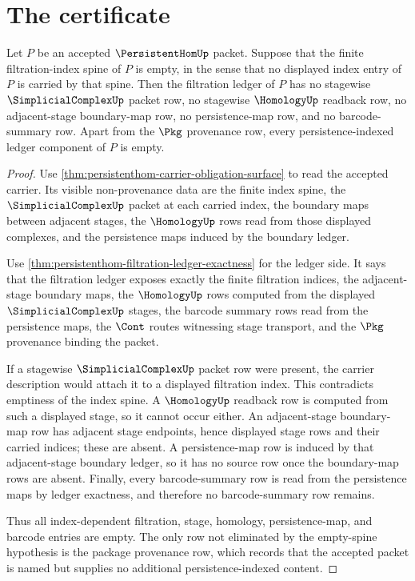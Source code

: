 \section{The certificate}
\label{sec:persistenthom-certificate}

\begin{theorem}
\label{thm:persistenthom-empty-filtration-spine-ledger-collapse}
Let $P$ be an accepted $\PersistentHomUp$ packet. Suppose that the finite filtration-index spine of $P$ is empty, in the sense that no displayed index entry of $P$ is carried by that spine. Then the filtration ledger of $P$ has no stagewise $\SimplicialComplexUp$ packet row, no stagewise $\HomologyUp$ readback row, no adjacent-stage boundary-map row, no persistence-map row, and no barcode-summary row. Apart from the $\Pkg$ provenance row, every persistence-indexed ledger component of $P$ is empty.
\end{theorem}
\begin{proof}
Use \autoref{thm:persistenthom-carrier-obligation-surface} to read the accepted carrier. Its visible non-provenance data are the finite index spine, the $\SimplicialComplexUp$ packet at each carried index, the boundary maps between adjacent stages, the $\HomologyUp$ rows read from those displayed complexes, and the persistence maps induced by the boundary ledger.

Use \autoref{thm:persistenthom-filtration-ledger-exactness} for the ledger side. It says that the filtration ledger exposes exactly the finite filtration indices, the adjacent-stage boundary maps, the $\HomologyUp$ rows computed from the displayed $\SimplicialComplexUp$ stages, the barcode summary rows read from the persistence maps, the $\Cont$ routes witnessing stage transport, and the $\Pkg$ provenance binding the packet.

If a stagewise $\SimplicialComplexUp$ packet row were present, the carrier description would attach it to a displayed filtration index. This contradicts emptiness of the index spine. A $\HomologyUp$ readback row is computed from such a displayed stage, so it cannot occur either. An adjacent-stage boundary-map row has adjacent stage endpoints, hence displayed stage rows and their carried indices; these are absent. A persistence-map row is induced by that adjacent-stage boundary ledger, so it has no source row once the boundary-map rows are absent. Finally, every barcode-summary row is read from the persistence maps by ledger exactness, and therefore no barcode-summary row remains.

Thus all index-dependent filtration, stage, homology, persistence-map, and barcode entries are empty. The only row not eliminated by the empty-spine hypothesis is the package provenance row, which records that the accepted packet is named but supplies no additional persistence-indexed content.
\end{proof}

